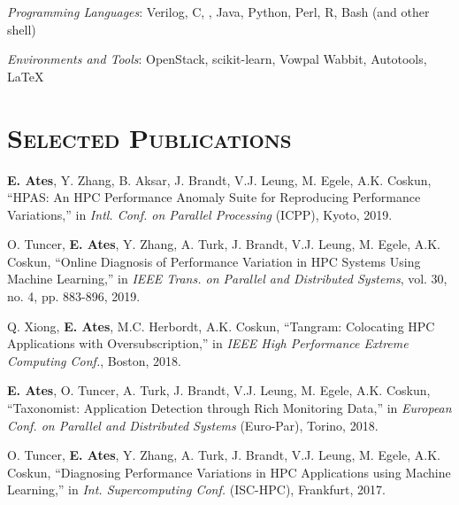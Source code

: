 \begin{resume}
	\emph{Programming Languages}: Verilog, C, \Cplusplus, Java, Python, Perl, R,
  Bash (and other shell)
	\setlength{\parskip}{1mm}

	\emph{Environments and Tools}: OpenStack, scikit-learn, Vowpal Wabbit, Autotools, \LaTeX




  \section{\textsc{Selected Publications}}
  \textbf{E. Ates}, Y. Zhang, B. Aksar, J. Brandt, V.J. Leung, M.
  Egele, A.K. Coskun, ``HPAS: An HPC Performance Anomaly Suite for Reproducing
  Performance Variations,'' in \textit{Intl. Conf. on Parallel Processing}
  (ICPP), Kyoto, 2019. 

  \vspace{0.1in}
  O. Tuncer, \textbf{E. Ates}, Y. Zhang, A. Turk, J. Brandt, V.J. Leung, M.
  Egele, A.K. Coskun, ``Online Diagnosis of Performance Variation in HPC Systems
  Using Machine Learning,'' in \textit{IEEE Trans. on Parallel and
    Distributed Systems}, vol. 30, no. 4, pp. 883-896, 2019.

  \vspace{0.1in}

  Q. Xiong, \textbf{E. Ates}, M.C. Herbordt, A.K. Coskun, ``Tangram: Colocating
  HPC Applications with Oversubscription,'' in \textit{IEEE High Performance
    Extreme Computing Conf.}, Boston, 2018.

  \vspace{0.1in}
  
  \textbf{E. Ates}, O. Tuncer, A. Turk, J. Brandt, V.J. Leung, M. Egele, A.K.
  Coskun, ``Taxonomist: Application Detection through Rich Monitoring Data,'' in
  \textit{European Conf. on Parallel and Distributed Systems} (Euro-Par),
  Torino, 2018. 

  \vspace{0.1in}
  
  O. Tuncer, \textbf{E. Ates}, Y. Zhang, A. Turk, J. Brandt, V.J. Leung, M.
  Egele, A.K. Coskun, ``Diagnosing Performance Variations in HPC Applications
  using Machine Learning,'' in \textit{Int. Supercomputing Conf.} (ISC-HPC),
  Frankfurt, 2017.


\end{resume}
